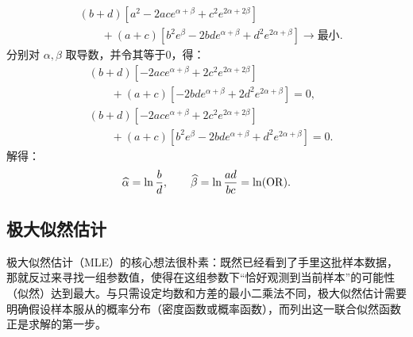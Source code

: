 \begin{align*}
&(b+d)[a^2-2ace^{\alpha+\beta}+c^2e^{2\alpha+2\beta}]\\
&\qquad +(a+c)[b^2e^\beta-2bde^{\alpha+\beta}+d^2e^{2\alpha+\beta}]
\longrightarrow\text{最小}.
\end{align*}
分别对 $\alpha,\beta$ 取导数，并令其等于0，得：
\begin{align*}
&(b+d)[-2ace^{\alpha+\beta}+2c^2e^{2\alpha+2\beta}]\\
&\qquad +(a+c)[-2bde^{\alpha+\beta}+2d^2e^{2\alpha+\beta}]=0,\\
&(b+d)[-2ace^{\alpha+\beta}+2c^2e^{2\alpha+2\beta}]\\
&\qquad +(a+c)[b^2e^\beta-2bde^{\alpha+\beta}+d^2e^{2\alpha+\beta}]=0.
\end{align*}
解得：
\[
\widehat\alpha=\ln\frac bd,\qquad
\widehat\beta=\ln\frac{ad}{bc}=\ln(\operatorname{OR}).
\]
\subsection{极大似然估计}
极大似然估计（MLE）的核心想法很朴素：既然已经看到了手里这批样本数据，那就反过来寻找一组参数值，使得在这组参数下“恰好观测到当前样本”的可能性（似然）达到最大。与只需设定均数和方差的最小二乘法不同，极大似然估计需要明确假设样本服从的概率分布（密度函数或概率函数），而列出这一联合似然函数正是求解的第一步。
